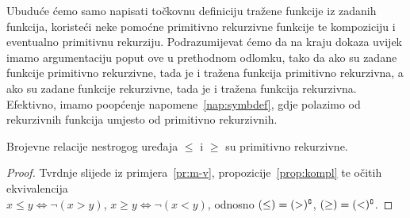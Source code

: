 Ubuduće ćemo samo napisati točkovnu definiciju tražene funkcije iz zadanih funkcija, koristeći neke pomoćne primitivno rekurzivne funkcije te kompoziciju i eventualno primitivnu rekurziju. Podrazumijevat ćemo da na kraju dokaza uvijek imamo argumentaciju poput ove u prethodnom odlomku, tako da ako su zadane funkcije primitivno rekurzivne, tada je i tražena funkcija primitivno rekurzivna, a ako su zadane funkcije rekurzivne, tada je i tražena funkcija rekurzivna. Efektivno, imamo poopćenje napomene~\ref{nap:symbdef}, gdje polazimo od rekurzivnih funkcija umjesto od primitivno rekurzivnih.

\begin{korolar}[{name=[primitivna rekurzivnost relacija nestrogog uređaja]}]\label{kor:mj-vj}
Brojevne relacije nestrogog uređaja $\le$ i $\ge$ su primitivno rekurzivne.
\end{korolar}
\begin{proof}
Tvrdnje slijede iz primjera~\ref{pr:m-v}, propozicije~\ref{prop:kompl} te očitih ekvivalencija\\
    $x\le y\Longleftrightarrow\lnot(x>y)$, 
    $x\ge y\Longleftrightarrow\lnot(x<y)$, odnosno
	$(\le) = (>)\sp{{\scriptscriptstyle\complement}}$, $(\ge) = (<)\sp{{\scriptscriptstyle\complement}}$.
\end{proof}

